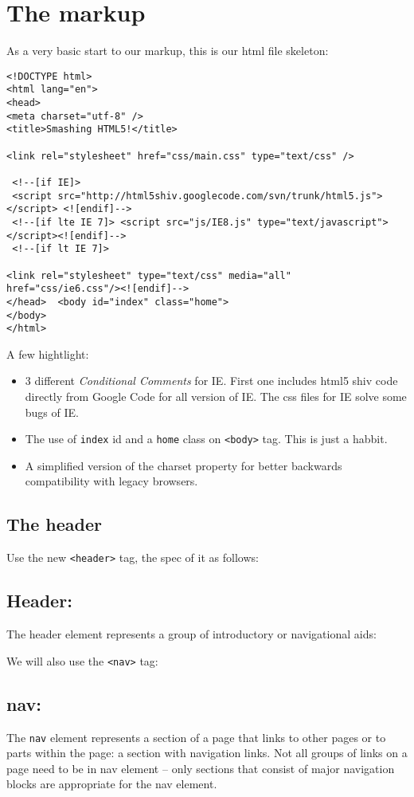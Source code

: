 \documentclass[a4paper, 12pt]{book}
\begin{document}
\chapter{The markup}
As a very basic start to our markup, this is our html file skeleton:
\begin{verbatim}
<!DOCTYPE html>
<html lang="en">
<head>
<meta charset="utf-8" />
<title>Smashing HTML5!</title>

<link rel="stylesheet" href="css/main.css" type="text/css" />

 <!--[if IE]>
 <script src="http://html5shiv.googlecode.com/svn/trunk/html5.js"></script> <![endif]-->
 <!--[if lte IE 7]> <script src="js/IE8.js" type="text/javascript"></script><![endif]-->
 <!--[if lt IE 7]>

<link rel="stylesheet" type="text/css" media="all" href="css/ie6.css"/><![endif]-->
</head>  <body id="index" class="home">
</body>
</html>

\end{verbatim}
A few hightlight:
\begin{itemize}
\item 3 different \emph{Conditional Comments} for IE. First one includes html5
shiv code directly from Google Code for all version of IE. The css files for IE
solve some bugs of IE.
\item The use of \verb|index| id and a \verb|home| class on \verb|<body>| tag.
This is just a habbit.
\item A simplified version of the charset property for better backwards
compatibility with legacy browsers.
\end{itemize}
\section{The header}
Use the new \verb|<header>| tag, the spec of it as follows:
\section{Header:} The header element represents a group of introductory or
navigational aids:

We will also use the \verb|<nav>| tag:
\section{nav:} The \verb|nav| element represents a section of a page that
links to other pages or to parts within the page: a section with navigation
links. Not all groups of links on a page need to be in nav element -- only
sections that consist of major navigation blocks are appropriate for the nav
element.
\end{document}
